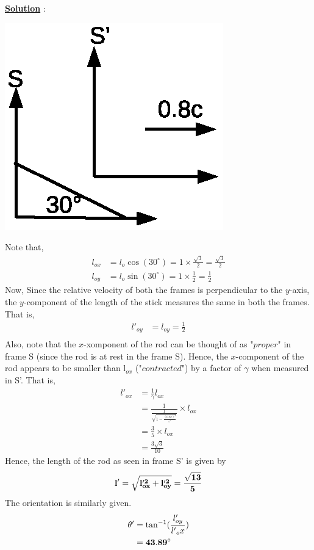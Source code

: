 \documentclass[10pt, a4paper]{article}
\begin{document}
\begin{enumerate}
{\underline {\bf Solution}} : 

\includegraphics{fig1}

Note that,
\begin{align*}
	l_{ox} &= l_{o} \cos (30^{\circ}) = 1 \times \frac{\sqrt{3}}{2} =  \frac{\sqrt{3}}{2} \\
	l_{oy} &= l_{o} \sin (30^{\circ}) = 1 \times \frac{1}{2} =  \frac{1}{2}
\end{align*}
Now,
	Since the relative velocity of both the frames is perpendicular to the $y$-axis, the $y$-component of the length of the stick measures the same in both the frames. That is,
\begin{align*}
	l'_{oy} &= l_{oy} =  \frac{1}{2} \\
\end{align*}
Also, note that the $x$-xomponent of the rod can be thought of as "$proper$" in frame S (since the rod is at rest in the frame S). Hence, the $x$-component of the rod appears to be smaller than l$_{ox}$ ("$contracted$") by a factor of $\gamma$ when measured in S'. That is,
\begin{align*}
	l'_{ox} &= \frac{1}{\gamma} l_{ox}\\
	&=  \frac{1}{\frac{1}{\sqrt{1-\frac{(0.8c)^{2}}{c^{2}}}}} \times  l_{ox}\\
	&= \frac{3}{5} \times  l_{ox}\\
	&= \frac{3\sqrt{3}}{10}
\end{align*}
Hence, the length of the rod as seen in frame S' is given by
\begin{align*}
	{\bf l' = \sqrt{l'^{2}_{ox} + l'^{2}_{oy} } = \frac{\sqrt{13}}{5}}
\end{align*}
The orientation is similarly given.
\begin{align*}
	\theta ' &= \tan ^{-1}(\frac{l'_{oy}}{l'{_ox}}) \\
	&= {\bf 43.89^{\circ}}
\end{align*}


\end{enumerate}
\end{document}
